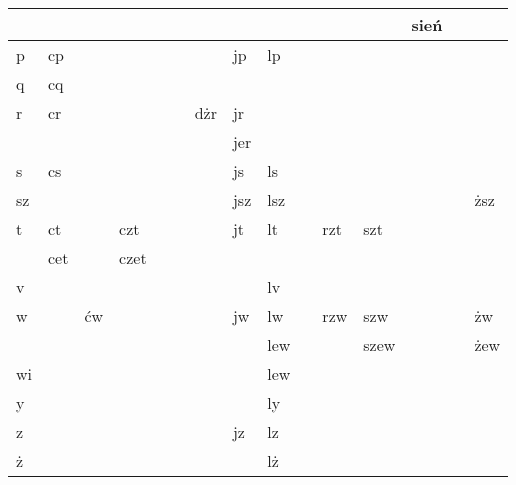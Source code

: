 \documentclass{article}
\begin{document}
\begin{longtable}{p{4mm}|p{4mm}p{4mm}p{4mm}p{4mm}p{4mm}p{4mm}p{4mm}p{4mm}p{4mm}p{4mm}p{4mm}p{4mm}p{4mm}p{4mm}}
 &  &  &  &  &  &  &  &  &  &  &  & sień &  & \\
\hline
p & cp &  &  &  &  &  & jp & lp &  &  &  &  &  & \\
\hline
q & cq &  &  &  &  &  &  &  &  &  &  &  &  & \\
\hline
r & cr &  &  &  &  & dżr & jr &  &  &  &  &  &  & \\
 &  &  &  &  &  &  & jer &  &  &  &  &  &  & \\
\hline
s & cs &  &  &  &  &  & js & ls &  &  &  &  &  & \\
\hline
sz &  &  &  &  &  &  & jsz & lsz &  &  &  &  &  & ższ\\
\hline
t & ct &  & czt &  &  &  & jt & lt &  & rzt & szt &  &  & \\
 & cet &  & czet &  &  &  &  &  &  &  &  &  &  & \\
\hline
v &  &  &  &  &  &  &  & lv &  &  &  &  &  & \\
\hline
w &  & ćw &  &  &  &  & jw & lw &  & rzw & szw &  &  & żw\\
 &  &  &  &  &  &  &  & lew &  &  & szew &  &  & żew\\
\hline
wi &  &  &  &  &  &  &  & lew &  &  &  &  &  & \\
\hline
y &  &  &  &  &  &  &  & ly &  &  &  &  &  & \\
\hline
z &  &  &  &  &  &  & jz & lz &  &  &  &  &  & \\
\hline
ż &  &  &  &  &  &  &  & lż &  &  &  &  &  & \\
\hline
\end{longtable}
\end{document}
